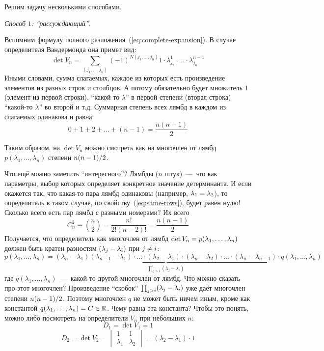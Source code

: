 \documentclass[a4paper,12pt]{article}
\theoremstyle{remark}
\begin{document}
  \begin{solution}
    Решим задачу несколькими способами.
    
    \medskip
    
    \emph{Способ $1$: ``рассуждающий''}.
    
    Вспомним формулу полного разложения~(\ref{eq:complete-expansion}).
    В случае определителя Вандермонда она примет вид:
    \begin{equation}\label{eq:p14-24-7-full-expansion}
      \det V_n = \sum_{(j_1, \ldots, j_n)} (-1)^{N(j_1, \ldots, j_n)} 1 \cdot \lambda_{j_2}^1 \cdot \ldots \cdot \lambda_{j_n}^{n-1}
    \end{equation}
    Иными словами, сумма слагаемых, каждое из которых есть произведение элементов из разных строк и столбцов.
    А потому обязательно будет множитель $1$ (элемент из первой строки), ``какой-то $\lambda$'' в первой степени (вторая строка) ``какой-то $\lambda$'' во второй и т.д.
    Суммарная степень всех лямбд в каждом из слагаемых одинакова и равна:
    \[
      0 + 1 + 2 + \ldots + (n-1) = \frac{n(n-1)}{2}
    \]
    
    Таким образом, на $\det V_n$ можно смотреть как на многочлен от лямбд $p(\lambda_1, \ldots, \lambda_n)$ степени $n(n \hm- 1) \hm/ 2$.
    
    Что ещё можно заметить ``интересного''?
    Лямбды ($n$ штук)~---~это как параметры, выбор которых определяет конкретное значение детерминанта.
    И если окажется так, что какая-то пара лямбд одинаковы (например, $\lambda_1 \hm= \lambda_2$), то определитель в таком случае, по свойству~(\ref{eq:same-rows}), будет равен нулю!
    Сколько всего есть пар лямбд с разными номерами?
    Их всего
    \[
      C_n^2 \equiv \binom{n}{2} = \frac{n!}{2!(n-2)!} = \frac{n(n-1)}{2}
    \]
    Получается, что определитель как многочлен от лямбд $\det V_n \hm= p(\lambda_1, \ldots, \lambda_n)$ должен быть кратен разностям $(\lambda_j \hm- \lambda_i)$ при $j \hm{\not=} i$:
    \[
      p(\lambda_1, \ldots, \lambda_n) = \underbrace{(\lambda_{n} - \lambda_1) (\lambda_{n-1} - \lambda_1) \cdot \ldots \cdot (\lambda_2 - \lambda_1) \cdot (\lambda_{n} - \lambda_2) \cdot \ldots \cdot (\lambda_{n} - \lambda_{n-1})}_{\prod_{j > i} (\lambda_j - \lambda_i)} \cdot q(\lambda_1, \ldots, \lambda_n)
    \]
    где $q(\lambda_1, \ldots, \lambda_n)$~---~какой-то другой многочлен от лямбд.
    Что можно сказать про этот многочлен?
    Произведение ``скобок'' $\prod_{j > i} (\lambda_j \hm- \lambda_i)$ уже даёт многочлен степени $n(n\hm-1) \hm/ 2$.
    Поэтому многочлен $q$ не может быть ничем иным, кроме как константой $q(\lambda_1, \ldots, \lambda_n) \hm= C \hm\in \RR$.
    Чему равна эта константа?
    Чтобы это понять, можно либо посмотреть на определители $V_n$ при небольших $n$:
    \[
      D_1 = \det V_1 = 1
    \]
    \[
      D_2 = \det V_2 = \begin{vmatrix}
        1         & 1\\
        \lambda_1 & \lambda_2
      \end{vmatrix} = (\lambda_2 - \lambda_1) \cdot 1
    \]
    

\end{solution}
\end{document}
